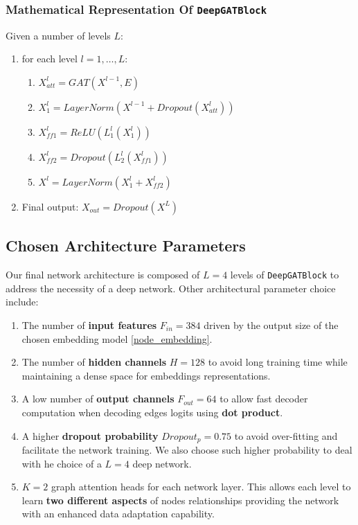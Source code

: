 \documentclass[11pt]{article}
\begin{document}
	\subsubsection{Mathematical Representation Of \texttt{DeepGATBlock}}
	Given a number of levels $L$:
	\begin{enumerate}
		\item for each level $l=1, \dots, L$:
		\begin{enumerate}
			\item $X_{att}^l = GAT(X^{l-1}, E)$
			\item $X_1^l = LayerNorm(X^{l-1} + Dropout(X_{att}^l))$
			\item $X_{ff1}^l = ReLU(L_1^l(X_1^l))$
			\item $X_{ff2}^l = Dropout(L_2^l(X_{ff1}^l))$
			\item $X^l = LayerNorm(X_1^l + X_{ff2}^l)$
		\end{enumerate}
		\item Final output: $X_{out} = Dropout(X^L)$
	\end{enumerate}
	
	\subsection{Chosen Architecture Parameters}
	Our final network architecture is composed of $L=4$ levels of \texttt{DeepGATBlock} to address the necessity of a deep network. Other architectural parameter choice include:
	\begin{enumerate}
		\item The number of \textbf{input features} $F_{in}=384$ driven by the output size of the chosen embedding model \ref{node_embedding}.
		
		\item The number of \textbf{hidden channels} $H=128$ to avoid long training time while maintaining a dense space for embeddings representations. 
		
		\item A low number of \textbf{output channels} $F_{out}=64$ to allow fast decoder computation when decoding edges logits using \textbf{dot product}.
		
		\item A higher \textbf{dropout probability} $Dropout_p=0.75$ to avoid over-fitting and facilitate the network training. We also choose such higher probability to deal with he choice of a $L=4$ deep network.  
		
		\item $K=2$ graph attention heads for each network layer. This allows each level to learn \textbf{two different aspects} of nodes relationships providing the network with an enhanced data adaptation capability. 
	\end{enumerate}
	
\end{document}
